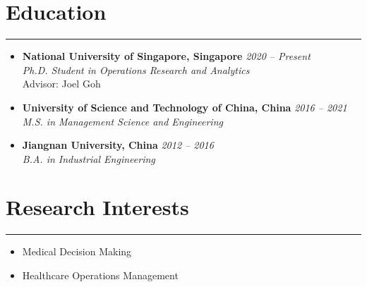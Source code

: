 \documentclass[12pt, a4paper]{article}
\begin{document}
{\small

\section*{Education}
\vspace*{0.4em}
\hrule height 0.4pt
\begin{itemize}[leftmargin=20pt, itemsep=6pt, parsep=0.2pt, topsep=1pt]

	\item[]
	\textbf{National University of Singapore, Singapore} \hfill \textit{2020 -- Present} \\
	\textit{Ph.D. Student in Operations Research and Analytics} \\
	Advisor: Joel Goh

	\item[]
	\textbf{University of Science and Technology of China, China} \hfill \textit{2016 -- 2021} \\
	\textit{M.S. in Management Science and Engineering}

	\item[]
	\textbf{Jiangnan University, China} \hfill \textit{2012 -- 2016} \\
	\textit{B.A. in Industrial Engineering}

\end{itemize}




\section*{Research Interests}
\vspace*{0.4em}
\hrule height 0.5pt
\begin{itemize}[leftmargin=36pt, itemsep=6pt, parsep=0.2pt, topsep=1pt]

	\item Medical Decision Making
	
	\item Healthcare Operations Management
	


\end{itemize}}
\end{document}
